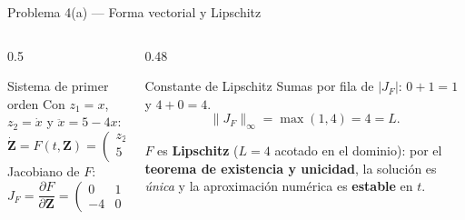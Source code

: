 \documentclass[aspectratio=169,10pt]{beamer}
\begin{document}
\begin{frame}{Problema 4(a) — Forma vectorial y Lipschitz}
\begin{columns}[T]
\begin{column}{0.5\textwidth}
\begin{cardgear}{Sistema de primer orden}{\faCogs}
{\footnotesize Con $z_1=x$, $z_2=\dot x$ y $\ddot x=5-4x$:
\[
\dot{\mathbf Z}=F(t,\mathbf Z)=\begin{pmatrix}z_2\\ 5-4z_1\end{pmatrix},\quad \mathbf Z(0)=\begin{pmatrix}0\\0\end{pmatrix}.
\]
Jacobiano de $F$:
\[
J_F=\frac{\partial F}{\partial \mathbf Z}=\begin{pmatrix}0 & 1\\ -4 & 0\end{pmatrix}.
\]}
\end{cardgear}
\end{column}
\begin{column}{0.48\textwidth}
\begin{cardgear}{Constante de Lipschitz}{\faRulerHorizontal}
{\footnotesize Sumas por fila de $|J_F|$: $0+1=1$ y $4+0=4$.
\[
\lVert J_F\rVert_\infty=\max(1,4)=4=L.
\]}
\end{cardgear}
\vspace{1mm}
\begin{cardnota}[\faCheckCircle]
{\footnotesize $F$ es \textbf{Lipschitz} ($L=4$ acotado en el dominio): por el \textbf{teorema de existencia y unicidad}, la solución es \emph{única} y la aproximación numérica es \textbf{estable} en $t$.}
\end{cardnota}
\end{column}
\end{columns}
\end{frame}
\end{document}
